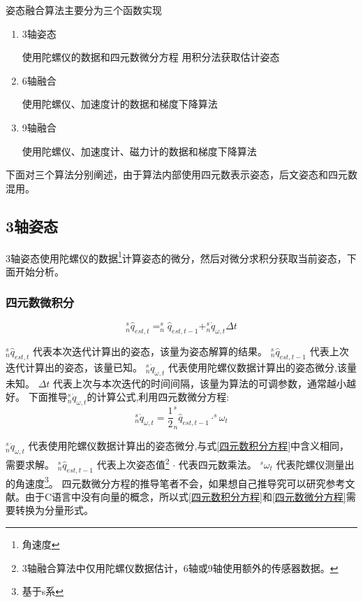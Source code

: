 \documentclass[12pt,a4paper]{article}
\renewcommand{\citet}[1]{\textsuperscript{\cite{#1}}}
\begin{document}
姿态融合算法主要分为三个函数实现
\begin{enumerate}
    \item 3轴姿态

        使用陀螺仪的数据和四元数微分方程 用积分法获取估计姿态
    \item 6轴融合

        使用陀螺仪、加速度计的数据和梯度下降算法
    \item 9轴融合

        使用陀螺仪、加速度计、磁力计的数据和梯度下降算法
\end{enumerate}
下面对三个算法分别阐述，由于算法内部使用四元数表示姿态，后文姿态和四元数混用。

\subsection{3轴姿态}
3轴姿态使用陀螺仪的数据\footnote{角速度}计算姿态的微分，然后对微分求积分获取当前姿态，下面开始分析。
\subsubsection{四元数微积分}
\begin{equation}\label{四元数积分方程}
    ^s_n\hat{q}_{est,t}=^s_n\hat{q}_{est,t-1}+^s_n\dot{q}_{\omega,t}\Delta t
\end{equation} 

$^s_n\hat{q}_{est,t}$    代表本次迭代计算出的姿态，该量为姿态解算的结果。
$^s_n\hat{q}_{est,t-1}$  代表上次迭代计算出的姿态，该量已知。
$^s_n\dot{q}_{\omega,t}$ 代表使用陀螺仪数据计算出的姿态微分,该量未知。
$\Delta t$               代表上次与本次迭代的时间间隔，该量为算法的可调参数，通常越小越好。
下面推导$^s_n\dot{q}_{\omega,t}$的计算公式,利用四元数微分方程:
\begin{equation}\label{四元数微分方程}
    ^s_n\dot{q}_{\omega,t}=\frac{1}{2} ^s_n\hat{q}_{est,t-1} \cdot ^s\omega_t
\end{equation} 

$^s_n\dot{q}_{\omega,t}$ 代表使用陀螺仪数据计算出的姿态微分,与式\ref{四元数积分方程}中含义相同，需要求解。
$^s_n\hat{q}_{est,t-1}$  代表上次姿态值\footnote{3轴融合算法中仅用陀螺仪数据估计，6轴或9轴使用额外的传感器数据。}
$\cdot$                  代表四元数乘法。
$^s\omega_t$             代表陀螺仪测量出的角速度\footnote{基于s系}。
四元数微分方程的推导笔者不会，如果想自己推导究可以研究参考文献\citet{四元数微分方程的推导}。由于C语言中没有向量的概念，所以式\ref{四元数积分方程}和\ref{四元数微分方程}需要转换为分量形式。
\end{document}

